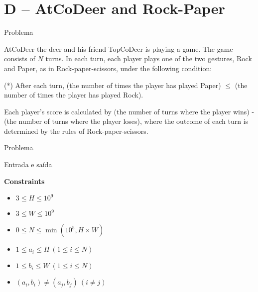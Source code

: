 \section{D -- AtCoDeer and Rock-Paper}

\begin{frame}[fragile]{Problema}

AtCoDeer the deer and his friend TopCoDeer is playing a game. The game consists of $N$ turns. In
each turn, each player plays one of the two gestures, Rock and Paper, as in Rock-paper-scissors,
under the following condition:

\vspace{0.1in}

(*) After each turn, (the number of times the player has played Paper) $\leq$ (the number of times
the player has played Rock).

\vspace{0.1in}

Each player's score is calculated by (the number of turns where the player wins) - (the number of
turns where the player loses), where the outcome of each turn is determined by the rules of
Rock-paper-scissors.

\end{frame}


\begin{frame}[fragile]{Problema}



\end{frame}

\begin{frame}[fragile]{Entrada e saída}

\textbf{Constraints}

\begin{itemize}
    \item $3\leq H\leq 10^9$
    \item $3\leq W\leq 10^9$
    \item $0\leq N\leq \min(10^5, H\times W)$
    \item $1\leq a_i\leq H\ (1\leq i\leq N)$
    \item $1\leq b_i\leq W\ (1\leq i\leq N)$
    \item $(a_i, b_i) \neq (a_j, b_j)\ (i\neq j)$
\end{itemize}

\end{frame}

